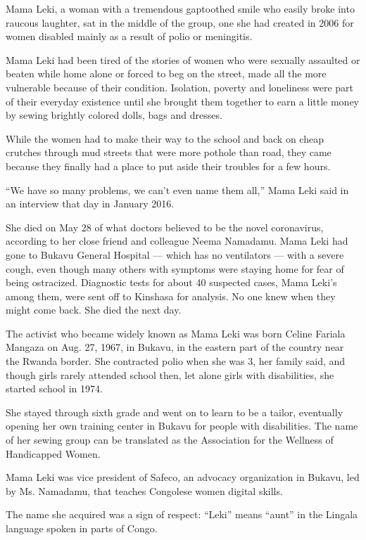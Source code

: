 Mama Leki, a woman with a tremendous gaptoothed smile who easily broke
into raucous laughter, sat in the middle of the group, one she had
created in 2006 for women disabled mainly as a result of polio or
meningitis.

Mama Leki had been tired of the stories of women who were sexually
assaulted or beaten while home alone or forced to beg on the street,
made all the more vulnerable because of their condition. Isolation,
poverty and loneliness were part of their everyday existence until she
brought them together to earn a little money by sewing brightly colored
dolls, bags and dresses.

While the women had to make their way to the school and back on cheap
crutches through mud streets that were more pothole than road, they came
because they finally had a place to put aside their troubles for a few
hours.

``We have so many problems, we can't even name them all,'' Mama Leki
said in an interview that day in January 2016.

She died on May 28 of what doctors believed to be the novel coronavirus,
according to her close friend and colleague Neema Namadamu. Mama Leki
had gone to Bukavu General Hospital --- which has no ventilators ---
with a severe cough, even though many others with symptoms were staying
home for fear of being ostracized. Diagnostic tests for about 40
suspected cases, Mama Leki's among them, were sent off to Kinshasa for
analysis. No one knew when they might come back. She died the next day.

The activist who became widely known as Mama Leki was born Celine
Fariala Mangaza on Aug. 27, 1967, in Bukavu, in the eastern part of the
country near the Rwanda border. She contracted polio when she was 3, her
family said, and though girls rarely attended school then, let alone
girls with disabilities, she started school in 1974.

She stayed through sixth grade and went on to learn to be a tailor,
eventually opening her own training center in Bukavu for people with
disabilities. The name of her sewing group can be translated as the
Association for the Wellness of Handicapped Women.

Mama Leki was vice president of Safeco, an advocacy organization in
Bukavu, led by Ms. Namadamu, that teaches Congolese women digital
skills.

The name she acquired was a sign of respect: ``Leki'' means ``aunt'' in
the Lingala language spoken in parts of Congo.

